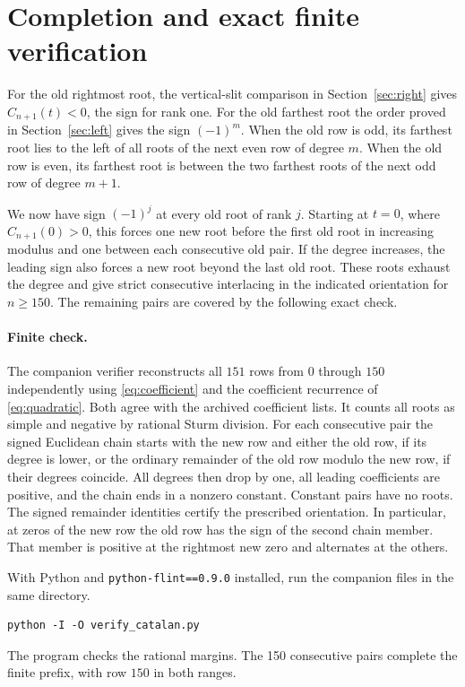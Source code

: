 \documentclass[11pt]{article}
\begin{document}
\section{Completion and exact finite verification}\label{sec:finite}

For the old rightmost root, the vertical-slit comparison in Section~\ref{sec:right} gives $C_{n+1}(t)<0$, the sign for rank one. For the old farthest root the order proved in Section~\ref{sec:left} gives the sign $(-1)^m$. When the old row is odd, its farthest root lies to the left of all roots of the next even row of degree $m$. When the old row is even, its farthest root is between the two farthest roots of the next odd row of degree $m+1$.

We now have sign $(-1)^j$ at every old root of rank $j$. Starting at $t=0$, where $C_{n+1}(0)>0$, this forces one new root before the first old root in increasing modulus and one between each consecutive old pair. If the degree increases, the leading sign also forces a new root beyond the last old root. These roots exhaust the degree and give strict consecutive interlacing in the indicated orientation for $n\ge150$. The remaining pairs are covered by the following exact check.

\paragraph{Finite check.}
The companion verifier reconstructs all \(151\) rows from \(0\) through \(150\) independently using \eqref{eq:coefficient} and the coefficient recurrence of \eqref{eq:quadratic}. Both agree with the archived coefficient lists. It counts all roots as simple and negative by rational Sturm division. For each consecutive pair the signed Euclidean chain starts with the new row and either the old row, if its degree is lower, or the ordinary remainder of the old row modulo the new row, if their degrees coincide. All degrees then drop by one, all leading coefficients are positive, and the chain ends in a nonzero constant. Constant pairs have no roots. The signed remainder identities certify the prescribed orientation. In particular, at zeros of the new row the old row has the sign of the second chain member. That member is positive at the rightmost new zero and alternates at the others.

With Python and \texttt{python-flint==0.9.0} installed, run the companion files in the same directory.
\begin{verbatim}
python -I -O verify_catalan.py
\end{verbatim}
The program checks the rational margins. The 150 consecutive pairs complete the finite prefix, with row \(150\) in both ranges.
\end{document}
